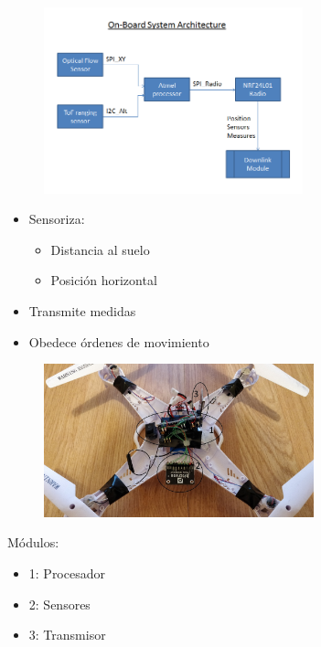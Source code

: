 \documentclass[a4,landscpae]{seminar}
\begin{document}
\begin{hslide}
\begin{minipage}{7cm}
	\begin{center}
		\begin{figure}
			\includegraphics[width=7.5cm]{Imagenes/Drone_arq}
		\end{figure}
	\end{center}
\end{minipage} \hfill
\begin{minipage}{3.9cm}
	\begin{itemize}
		\item Sensoriza:
			\begin{itemize}
				\item Distancia al suelo
				\item Posici\'on horizontal
			\end{itemize}
		\item Transmite medidas
		\item Obedece \'ordenes de movimiento
	\end{itemize}
\end{minipage}
\end{hslide}
\begin{hslide}
\begin{minipage}{3cm}
	\begin{center}
		\begin{figure}
			\includegraphics[width=7.8cm]{Imagenes/OnBoard_System_Mod}
		\end{figure}
	\end{center}
\end{minipage} \hfill
\begin{minipage}{2.8cm}
	M\'odulos:
	\begin{itemize}
		\item 1: Procesador
		\item 2: Sensores
		\item 3: Transmisor
	\end{itemize}
\end{minipage}
\end{hslide}
\end{document}
